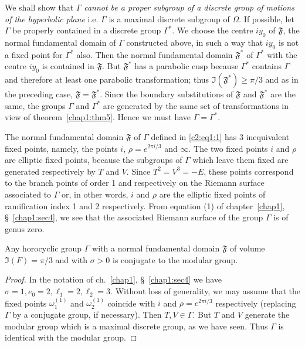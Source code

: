 We shall show that $\Gamma$ \textit{cannot be a proper subgroup of a
  discrete group of motions of the hyperbolic plane} i.e. $\Gamma$ is
a maximal discrete subgroup of $\Omega$. If possible, let $\Gamma$ be
properly contained in a discrete group $\Gamma^{\ast}$. We choose the
centre $iy_0$ of $\mathfrak{F}$, the normal fundamental domain of
$\Gamma$ constructed above, in such a way that $iy_0$ is not a fixed
point for $\Gamma^{\ast}$ also. Then the normal fundamental domain
$\mathfrak{F}^{\ast}$ of $\Gamma^{\ast}$ with the centre $iy_0$ is
contained in $\mathfrak{F}$. But $\mathfrak{F}^{\ast}$ has a parabolic
cusp because $\Gamma^{\ast}$ contains $\Gamma$ and therefore at least
one parabolic transformation; thus
$\mathfrak{I}(\mathfrak{F}^{\ast})\geq \pi/3$ and as in the preceding
case, $\mathfrak{F}=\mathfrak{F}^{\ast}$. Since the boundary
substitutions of $\mathfrak{F}$ and $\mathfrak{F}^{\ast}$ are the
same, the groups $\Gamma$ and $\Gamma^{\ast}$ are generated by the
same set of transformations in view of theorem~\ref{chap1:thm5}. 
Hence we must have $\Gamma=\Gamma^{\ast}$. 

The normal fundamental domain $\mathfrak{F}$ of $\Gamma$ defined in
\eqref{c2:eq1:1} has 3 inequivalent fixed points, namely, the points $i$,
$\rho=e^{2\pi i/3}$ and $\infty$. The two fixed points $i$ and $\rho$
are elliptic fixed points, because the subgroups of $\Gamma$ which
leave them fixed are generated respectively by $T$ and $V$. Since $T^2
= V^3 = - E$, these points correspond to the branch points of order 1
and  respectively on the Riemann surface associated to
$\Gamma$ or, in other words, $i$ and $\rho$ are the elliptic fixed
points of ramification index 1 and 2 respectively. From equation (1)
of chapter~\ref{chap1}, \S~\ref{chap1:sec4}, we see that 
the associated Riemann surface of the group $\Gamma$ is of genus zero.

\begin{remark*}
Any horocyclic group $\Gamma$ with a normal fundamental domain
$\mathfrak{F}$ of volume $\mathfrak{I}(F)=\pi/3$ and with $\sigma >0$
is conjugate to the modular group.
\end{remark*}

\begin{proof}
In the notation of ch.~\ref{chap1}, \S~\ref{chap1:sec4} 
we have $\sigma = 1, e_0=2, \ell_1=2,
\ell_2=3$. Without loss of generality, we may assume that the fixed
points $\omega^{(1)}_1$ and $\omega^{(1)}_2$ coincide with $i$ and
$\rho=e^{2\pi i/3}$ respectively (replacing $\Gamma$ by a conjugate
group, if necessary). Then $T, V \in \Gamma$. But $T$ and $V$
generate the modular group which is a maximal discrete group, as we
have seen. Thus $\Gamma$ is identical with the modular group. 
\end{proof}

